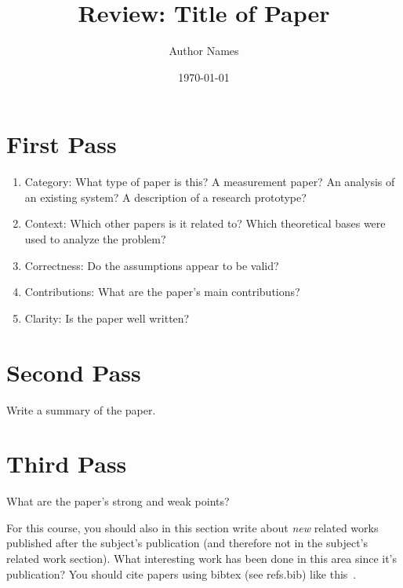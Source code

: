 \documentclass{article}
\title{Review: Title of Paper}
\author[1]{Author Names}
\affil[1]{Loyola Marymount University}
\date{\today}
\begin{document}
\maketitle


\section{First Pass}
\begin{enumerate}
    \item Category: What type of paper is this? A measurement paper? An analysis of an existing system? A description of a research prototype?
    \item Context: Which other papers is it related to? Which theoretical bases were used to analyze the problem?
    \item Correctness: Do the assumptions appear to be valid?
    \item Contributions: What are the paper’s main contributions?
    \item Clarity: Is the paper well written?
\end{enumerate}

\section{Second Pass}
Write a summary of the paper.

\section{Third Pass}
What are the paper's strong and weak points?

For this course, you should also in this section write about \textit{new} related works published after the subject's publication (and therefore not in the subject's related work section). What interesting work has been done in this area since it's publication? You should cite papers using bibtex (see refs.bib) like this~\cite{DBLP:conf/sirocco/ColemanCK23}.


\printbibliography
\end{document}
